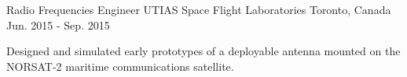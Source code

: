 \begin{cventries}
  \cventry
    {Radio Frequencies Engineer} %
    {UTIAS Space Flight Laboratories} %
    {Toronto, Canada} %
    {Jun. 2015 - Sep. 2015} %
    {
      \begin{cvitems} %
        \item {Designed and simulated early prototypes of a deployable antenna mounted on the NORSAT-2 maritime communications satellite.}
      \end{cvitems}
    }

\end{cventries}
